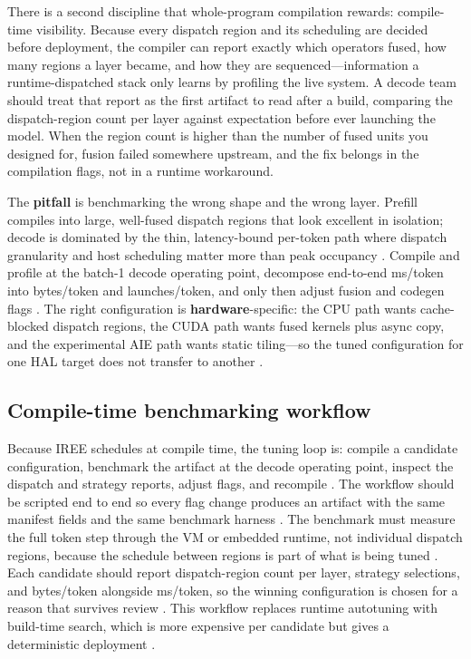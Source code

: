 There is a second discipline that whole-program compilation rewards: compile-time visibility. Because every dispatch region and its scheduling are decided before deployment, the compiler can report exactly which operators fused, how many regions a layer became, and how they are sequenced---information a runtime-dispatched stack only learns by profiling the live system. A decode team should treat that report as the first artifact to read after a build, comparing the dispatch-region count per layer against expectation before ever launching the model. When the region count is higher than the number of fused units you designed for, fusion failed somewhere upstream, and the fix belongs in the compilation flags, not in a runtime workaround.

The \textbf{pitfall} is benchmarking the wrong shape and the wrong layer. Prefill compiles into large, well-fused dispatch regions that look excellent in isolation; decode is dominated by the thin, latency-bound per-token path where dispatch granularity and host scheduling matter more than peak occupancy \citep{kwon2023vllm,taxbreak2026}. Compile and profile at the batch-1 decode operating point, decompose end-to-end ms/token into bytes/token and launches/token, and only then adjust fusion and codegen flags \citep{patel2025llminference,memoryfloor2026}. The right configuration is \textbf{hardware}-specific: the CPU path wants cache-blocked dispatch regions, the CUDA path wants fused kernels plus async copy, and the experimental AIE path wants static tiling---so the tuned configuration for one HAL target does not transfer to another \citep{amd2024xdna,dlbook}.

\subsection{Compile-time benchmarking workflow}

Because IREE schedules at compile time, the tuning loop is: compile a candidate configuration, benchmark the artifact at the decode operating point, inspect the dispatch and strategy reports, adjust flags, and recompile \citep{iree2024,taxbreak2026}. The workflow should be scripted end to end so every flag change produces an artifact with the same manifest fields and the same benchmark harness \citep{chen2020compilerbasedhardw,memoryfloor2026}. The benchmark must measure the full token step through the VM or embedded runtime, not individual dispatch regions, because the schedule between regions is part of what is being tuned \citep{patel2025llminference,taxbreak2026}. Each candidate should report dispatch-region count per layer, strategy selections, and bytes/token alongside ms/token, so the winning configuration is chosen for a reason that survives review \citep{memoryfloor2026,patel2025llminference}. This workflow replaces runtime autotuning with build-time search, which is more expensive per candidate but gives a deterministic deployment \citep{iree2024,chen2020compilerbasedhardw}.

